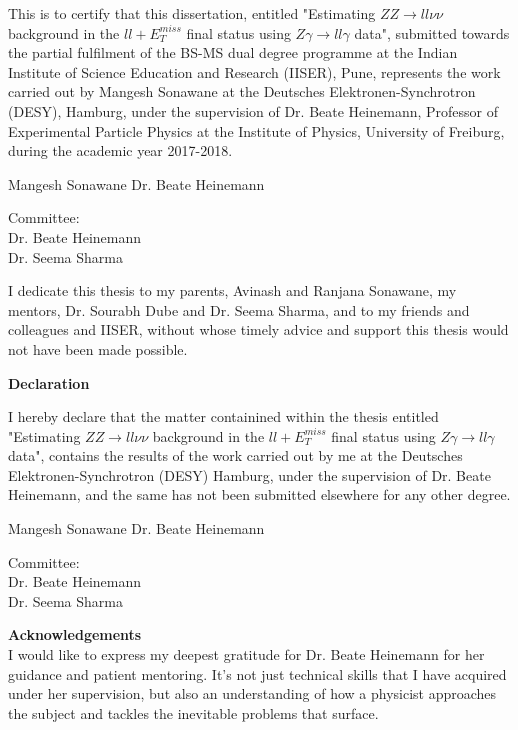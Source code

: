\documentclass[11pt,a4paper]{report}
\newcommand{\ZZ}{$ZZ\to ll\nu\nu$ }
\newcommand{\Zg}{$Z\gamma\to ll\gamma$ }
\newcommand{\llM}{$ll+E_T^{miss}$ }
\newcommand\blankpage{%
    \null
    \thispagestyle{empty}%
    \addtocounter{page}{-1}%
    \newpage}
\begin{document}
\vspace{1cm}
\normalsize This is to certify that this dissertation, entitled "Estimating \ZZ background in the \llM final status using \Zg data", submitted towards the partial fulfilment of the BS-MS dual degree programme at the Indian Institute of Science Education and Research (IISER), Pune, represents the work carried out by Mangesh Sonawane at the Deutsches Elektronen-Synchrotron (DESY), Hamburg, under the supervision of Dr. Beate Heinemann, Professor of Experimental Particle Physics at the Institute of Physics, University of Freiburg, during the academic year 2017-2018.
\vfill
\begin{center}
Mangesh Sonawane\hspace{8cm}
Dr. Beate Heinemann
\end{center}
\vfill
Committee:\\
Dr. Beate Heinemann\\
Dr. Seema Sharma
\vfill
\vfill
\newpage
\blankpage
\newpage
{}
\vspace*{\fill}
\noindent I dedicate this thesis to my parents, Avinash and Ranjana Sonawane, my mentors, Dr. Sourabh Dube and Dr. Seema Sharma, and to my friends and colleagues and IISER, without whose timely advice and support this thesis would not have been made possible.
\vspace*{\fill}
\newpage
\blankpage
\newpage
\begin{center}
\Huge \textbf{Declaration\\}
\end{center}
\vspace{1cm}
\normalsize I hereby declare that the matter containined within the thesis entitled "Estimating \ZZ background in the \llM final status using \Zg data", contains the results of the work carried out by me at the Deutsches Elektronen-Synchrotron (DESY) Hamburg, under the supervision of Dr. Beate Heinemann, and the same has not been submitted elsewhere for any other degree.
\vfill
\begin{center}
Mangesh Sonawane\hspace{8cm}
Dr. Beate Heinemann
\end{center}
\vfill
Committee:\\
Dr. Beate Heinemann\\
Dr. Seema Sharma
\vfill
\vfill
\newpage
\blankpage
\newpage
{\Huge \textbf{Acknowledgements\vspace{2cm}\\}}
I would like to express my deepest gratitude for Dr. Beate Heinemann for her guidance and patient mentoring. It's not just technical skills that I have acquired under her supervision, but also an understanding of how a physicist approaches the subject and tackles the inevitable problems that surface.\vspace{1cm}
\end{document}
